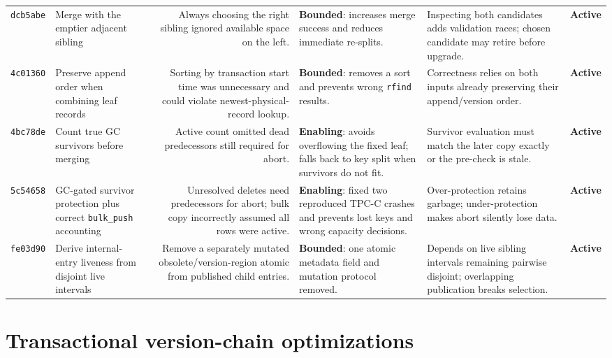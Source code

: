 \documentclass[10pt,a4paper,landscape]{article}
\newcommand{\code}[1]{\texttt{#1}}
\newcommand{\commit}[1]{\code{#1}}
\newcommand{\gainbounded}{\textbf{Bounded}}
\newcommand{\gainenabling}{\textbf{Enabling}}
\newcommand{\stateactive}{\textbf{Active}}
\begin{document}
\begin{longtable}{IORGKS}
\commit{dcb5abe} & Merge with the emptier adjacent sibling & Always choosing the right
sibling ignored available space on the left. & \gainbounded: increases merge success and
reduces immediate re-splits. & Inspecting both candidates adds validation races; chosen
candidate may retire before upgrade. & \stateactive \\

\commit{4c01360} & Preserve append order when combining leaf records & Sorting by
transaction start time was unnecessary and could violate newest-physical-record lookup. &
\gainbounded: removes a sort and prevents wrong \code{rfind} results. & Correctness relies on
both inputs already preserving their append/version order. & \stateactive \\

\commit{4bc78de} & Count true GC survivors before merging & Active count omitted dead
predecessors still required for abort. & \gainenabling: avoids overflowing the fixed leaf;
falls back to key split when survivors do not fit. & Survivor evaluation must match the
later copy exactly or the pre-check is stale. & \stateactive \\

\commit{5c54658} & GC-gated survivor protection plus correct \code{bulk\_push} accounting &
Unresolved deletes need predecessors for abort; bulk copy incorrectly assumed all rows
were active. & \gainenabling: fixed two reproduced TPC-C crashes and prevents lost keys and
wrong capacity decisions. & Over-protection retains garbage; under-protection makes abort
silently lose data. & \stateactive \\

\commit{fe03d90} & Derive internal-entry liveness from disjoint live intervals & Remove a
separately mutated obsolete/version-region atomic from published child entries. &
\gainbounded: one atomic metadata field and mutation protocol removed. & Depends on live
sibling intervals remaining pairwise disjoint; overlapping publication breaks selection. &
\stateactive \\
\bottomrule
\end{longtable}

\section{Transactional version-chain optimizations}
\end{document}
